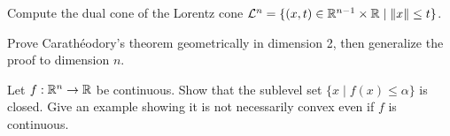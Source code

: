 \begin{exercise}[$\star\star$]
Compute the dual cone of the Lorentz cone
$\mathcal{L}^n = \{(x,t) \in \mathbb{R}^{n-1}\times\mathbb{R} \mid \left\| x \right\| \leq t\}$.
\end{exercise}

\begin{exercise}[$\star\star\star$]
Prove Carath\'eodory's theorem geometrically in dimension 2, then generalize
the proof to dimension $n$.
\end{exercise}

\begin{exercise}[$\star\star\star$]
Let $f : \mathbb{R}^n \to \mathbb{R}$ be continuous. Show that the sublevel set
$\{x \mid f(x) \leq \alpha\}$ is closed. Give an example showing it is not
necessarily convex even if $f$ is continuous.
\end{exercise}
